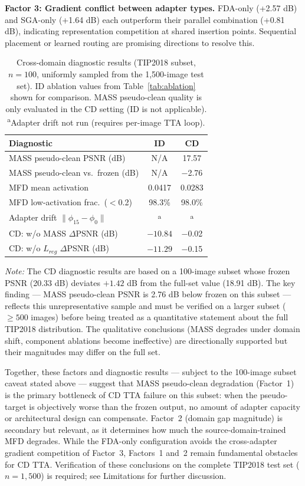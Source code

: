 \documentclass[review,10pt]{elsarticle}
\begin{document}
\textbf{Factor 3: Gradient conflict between adapter types.} FDA-only (+2.57 dB) and SGA-only (+1.64 dB) each outperform their parallel combination (+0.81 dB), indicating representation competition at shared insertion points. Sequential placement or learned routing are promising directions to resolve this.

\begin{table}[tb]
\centering
\footnotesize
\caption{Cross-domain diagnostic results (TIP2018 subset, $n=100$, uniformly sampled from the 1,500-image test set). ID ablation values from Table~\ref{tab:ablation} shown for comparison. MASS pseudo-clean quality is only evaluated in the CD setting (ID is not applicable). \textsuperscript{a}Adapter drift not run (requires per-image TTA loop).}
\label{tab:cd_diagnostics}
\setlength{\tabcolsep}{3pt}
\begin{tabular}{@{}p{4.2cm}cc@{}}
\toprule
Diagnostic & ID & CD \\
\midrule
MASS pseudo-clean PSNR (dB) & N/A & 17.57 \\
MASS pseudo-clean vs.\ frozen (dB) & N/A & $-$2.76 \\
MFD mean activation & 0.0417 & 0.0283 \\
MFD low-activation frac.\ ($<$0.2) & 98.3\% & 98.0\% \\
Adapter drift $\|\phi_{15}-\phi_0\|$ & \textsuperscript{a} & \textsuperscript{a} \\
CD: w/o MASS $\Delta$PSNR (dB) & $-10.84$ & $-$0.02 \\
CD: w/o $L_{reg}$ $\Delta$PSNR (dB) & $-11.29$ & $-$0.15 \\
\bottomrule
\end{tabular}
\end{table}

\textit{Note:} The CD diagnostic results are based on a 100-image subset whose frozen PSNR (20.33 dB) deviates $+1.42$ dB from the full-set value (18.91 dB). The key finding --- MASS pseudo-clean PSNR is 2.76 dB below frozen on this subset --- reflects this unrepresentative sample and must be verified on a larger subset ($\ge 500$ images) before being treated as a quantitative statement about the full TIP2018 distribution. The qualitative conclusions (MASS degrades under domain shift, component ablations become ineffective) are directionally supported but their magnitudes may differ on the full set.

Together, these factors and diagnostic results --- subject to the 100-image subset caveat stated above --- suggest that MASS pseudo-clean degradation (Factor~1) is the primary bottleneck of CD TTA failure on this subset: when the pseudo-target is objectively worse than the frozen output, no amount of adapter capacity or architectural design can compensate. Factor~2 (domain gap magnitude) is secondary but relevant, as it determines how much the source-domain-trained MFD degrades. While the FDA-only configuration avoids the cross-adapter gradient competition of Factor~3, Factors~1 and~2 remain fundamental obstacles for CD TTA. Verification of these conclusions on the complete TIP2018 test set ($n=1,500$) is required; see Limitations for further discussion.
\end{document}
